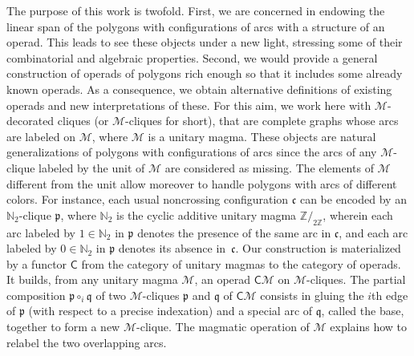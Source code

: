 \documentclass[10pt,reqno]{amsart}
\numberwithin{equation}{subsection}
\newcommand{\N}{\mathbb{N}}
\newcommand{\Z}{\mathbb{Z}}
\newcommand{\Mca}{\mathcal{M}}
\newcommand{\Cfr}{\mathfrak{c}}
\newcommand{\Pfr}{\mathfrak{p}}
\newcommand{\Qfr}{\mathfrak{q}}
\newcommand{\Cli}{\mathsf{C}}
\begin{document}
The purpose of this work is twofold. First, we are concerned in endowing
the linear span of the polygons with configurations of arcs with a
structure of an operad. This leads to see these objects under a new
light, stressing some of their combinatorial and algebraic properties.
Second, we would provide a general construction of operads of polygons
rich enough so that it includes some already known operads. As a
consequence, we obtain alternative definitions of existing operads and
new interpretations of these. For this aim, we work here with
$\Mca$-decorated cliques (or $\Mca$-cliques for short), that are
complete graphs whose arcs are labeled on $\Mca$, where $\Mca$ is a
unitary magma. These objects are natural generalizations of polygons
with configurations of arcs since the arcs of any $\Mca$-clique labeled
by the unit of $\Mca$ are considered as missing. The elements of $\Mca$
different from the unit allow moreover to handle polygons with arcs of
different colors. For instance, each usual noncrossing configuration
$\Cfr$ can be encoded by an $\N_2$-clique $\Pfr$, where $\N_2$ is the
cyclic additive unitary magma $\Z/_{2\Z}$, wherein each arc labeled by
$1 \in \N_2$ in $\Pfr$ denotes the presence of the same arc in $\Cfr$,
and each arc labeled by $0 \in \N_2$ in $\Pfr$ denotes its absence
in~$\Cfr$. Our construction is materialized by a functor $\Cli$ from
the category of unitary magmas to the category of operads. It builds,
from any unitary magma $\Mca$, an operad $\Cli\Mca$ on $\Mca$-cliques.
The partial composition $\Pfr \circ_i \Qfr$ of two $\Mca$-cliques $\Pfr$
and $\Qfr$ of $\Cli\Mca$ consists in gluing the $i$th edge of $\Pfr$
(with respect to a precise indexation) and a special arc of $\Qfr$,
called the base, together to form a new $\Mca$-clique. The magmatic
operation of $\Mca$ explains how to relabel the two overlapping arcs.
\smallskip
\end{document}
